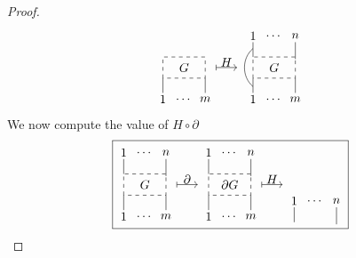 \documentclass{amsart}
\theoremstyle{definition}
\begin{document}
\begin{proof}
\begin{equation*}
{\begin{tikzpicture}[scale=.6]
			\draw [dashed] (0,0) rectangle (2,1); \node at (1, .5) {$G$};
			
			\node at (0,-1) {$1$}; \draw (0,-.7) -- (0,0);
			\node at (1,-1) {$\dots$};
			\node at (2,-1) {$m$}; \draw (2,-.7) -- (2,0);
			
			\node at (3,.75) {$H$}; \draw [|->] (2.5,.5) -- (3.5,.5);
			\end{tikzpicture}
			\  %
			\begin{tikzpicture}[scale=.6]
			\node at (0,2) {$1$}; \draw (0,1.7) -- (0,1);
			\node at (1,2) {$\dots$};
			\node at (2,2) {$n$}; \draw (2,1.7) -- (2,.9);
			
			\draw [dashed] (0,0) rectangle (2,1); \node at (1, .5) {$G$};
			
			\draw (0,-.4)  to[out=140,in=-140]  (0,1.4);
			\node at (0,-1) {$1$}; \draw (0,-.7) -- (0,0);
			\node at (1,-1) {$\dots$};
			\node at (2,-1) {$m$}; \draw (2,-.7) -- (2,0);
			\end{tikzpicture}}	
		\end{equation*}
		We now compute the value of $H \circ \partial$
		\begin{equation*}
		\boxed{\begin{tikzpicture}[scale=.6]
			\node at (0,2) {$1$}; \draw (0,1.7) -- (0,1);
			\node at (1,2) {$\dots$};
			\node at (2,2) {$n$}; \draw (2,1.7) -- (2,.9);
			
			\draw [dashed] (0,0) rectangle (2,1); \node at (1, .5) {$G$};
			
			\node at (0,-1) {$1$}; \draw (0,-.7) -- (0,0);
			\node at (1,-1) {$\dots$};
			\node at (2,-1) {$m$}; \draw (2,-.7) -- (2,0);
			
			\node at (3,.75) {$\partial$}; \draw [|->] (2.5,.5) -- (3.5,.5);
			\end{tikzpicture}
			\; %
			\begin{tikzpicture}[scale=.6]
			\node at (0,2) {$1$}; \draw (0,1.7) -- (0,1);
			\node at (1,2) {$\dots$};
			\node at (2,2) {$n$}; \draw (2,1.7) -- (2,.9);
			
			\draw [dashed] (0,0) rectangle (2,1); \node at (1, .5) {$\partial G$};
			
			\node at (0,-1) {$1$}; \draw (0,-.7) -- (0,0);
			\node at (1,-1) {$\dots$};
			\node at (2,-1) {$m$}; \draw (2,-.7) -- (2,0);
			
			\node at (3,.75) {$H$}; \draw [|->] (2.5,.5) -- (3.5,.5);
			\end{tikzpicture}
			\ %
			\begin{tikzpicture}[scale=.6]
			\node at (0,2) {$1$}; \draw (0,1.7) -- (0,1);
			\node at (1,2) {$\dots$};
			\node at (2,2) {$n$}; \draw (2,1.7) -- (2,.9);
			

\end{tikzpicture}}
\end{equation*}
\end{proof}
\end{document}

